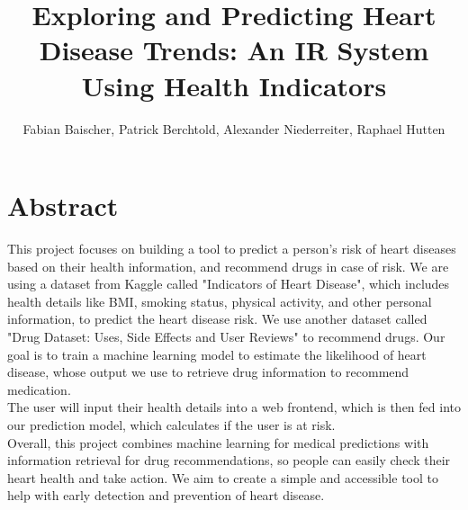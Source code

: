 \documentclass{article}
\title{Exploring and Predicting Heart Disease Trends: An IR System Using  Health Indicators}
\author{Fabian Baischer, Patrick Berchtold, Alexander Niederreiter, Raphael Hutten}
\begin{document}
\maketitle


\section{Abstract}

This project focuses on building a tool to predict a person’s risk of heart diseases based on their health information, and recommend drugs in case of risk.
We are using a dataset from Kaggle called "Indicators of Heart Disease",
which includes health details like BMI, smoking status, physical activity, and other personal information, to predict the heart disease risk.
We use another dataset called "Drug Dataset: Uses, Side Effects and User Reviews" to recommend drugs.
Our goal is to train a machine learning model to estimate the likelihood of heart disease,
whose output we use to retrieve drug information to recommend medication.\\
The user will input their health details into a web frontend, which is then fed into our prediction model, which calculates if the user is at risk.\\
Overall, this project combines machine learning for medical predictions with information retrieval for drug recommendations,
so people can easily check their heart health and take action.
We aim to create a simple and accessible tool to help with early detection and prevention of heart disease.
\end{document}
